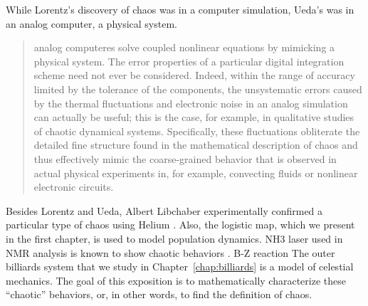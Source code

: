 \documentclass[10pt,twoside,draft]{book}
\begin{document}
While Lorentz's discovery of chaos was in a computer simulation, Ueda's was in an analog computer, a physical system.
\citet[p.383]{campbell}
\begin{quotation}
  analog computeres solve coupled nonlinear equations by mimicking a physical system.
  The error properties of a particular digital integration scheme need not ever be considered.
  Indeed, within the range of accuracy limited by the tolerance of the components, the unsystematic errors caused by the thermal fluctuations and electronic noise in an analog simulation can actually be useful; this is the case, for example, in qualitative studies of chaotic dynamical systems.
  Specifically, these fluctuations obliterate the detailed fine structure found in the mathematical description of chaos and thus effectively mimic the coarse-grained behavior that is observed in actual physical experiments in, for example, convecting fluids or nonlinear electronic circuits.
\end{quotation}
Besides Lorentz and Ueda, Albert Libchaber experimentally confirmed a particular type of chaos using Helium \citep{gleick}.
Also, the logistic map, which we present in the first chapter, is used to model population dynamics.
NH3 laser used in NMR analysis is known to show chaotic behaviors \citep{kantz-schreiber}.
B-Z reaction \citep{zhang}
The outer billiards system that we study in Chapter~\ref{chap:billiards} is a model of celestial mechanics.
The goal of this exposition is to mathematically characterize these ``chaotic'' behaviors, or, in other words, to find the definition of chaos.
\end{document}
